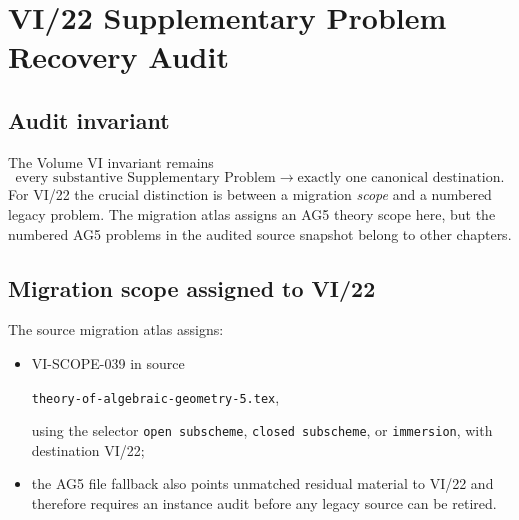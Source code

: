 \chapter*{VI/22 Supplementary Problem Recovery Audit}

\section*{Audit invariant}
The Volume VI invariant remains
\[
\boxed{\text{every substantive Supplementary Problem}\longrightarrow\text{exactly one canonical destination}.}
\]
For VI/22 the crucial distinction is between a migration \emph{scope} and a numbered legacy
problem.  The migration atlas assigns an AG5 theory scope here, but the numbered AG5 problems in
the audited source snapshot belong to other chapters.

\section*{Migration scope assigned to VI/22}
The source migration atlas assigns:
\begin{itemize}
\item VI-SCOPE-039 in source\par\noindent\texttt{theory-of-algebraic-geometry-5.tex},\par\noindent using the selector \texttt{open subscheme}, \texttt{closed subscheme}, or \texttt{immersion}, with destination VI/22;
\item the AG5 file fallback also points unmatched residual material to VI/22 and therefore requires
an instance audit before any legacy source can be retired.
\end{itemize}

